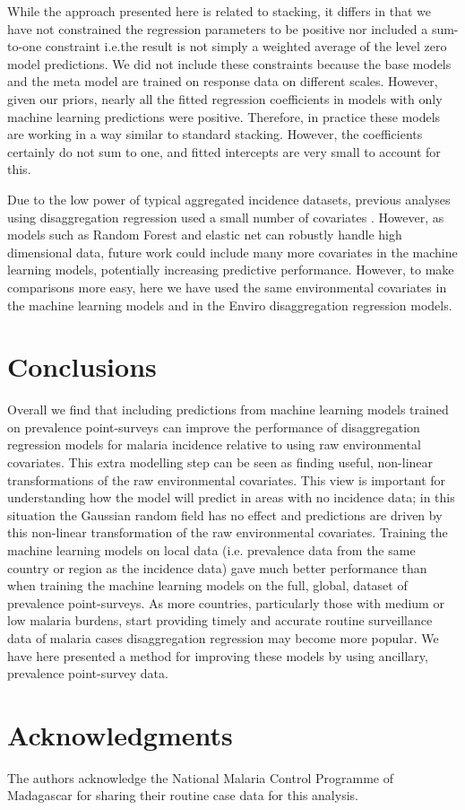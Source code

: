 \documentclass[review]{elsarticle}
\begin{document}
While the approach presented here is related to stacking, it differs in that we have not constrained the regression parameters to be positive nor included a sum-to-one constraint i.e.\thinspace the result is not simply a weighted average of the level zero model predictions.
We did not include these constraints because the base models and the meta model are trained on response data on different scales.
However, given our priors, nearly all the fitted regression coefficients in models with only machine learning predictions were positive.
Therefore, in practice these models are working in a way similar to standard stacking.
However, the coefficients certainly do not sum to one, and fitted intercepts are very small to account for this.


Due to the low power of typical aggregated incidence datasets, previous analyses using disaggregation regression used a small number of covariates \citep{sturrock2014fine}.
However, as models such as Random Forest and elastic net can robustly handle high dimensional data, future work could include many more covariates in the machine learning models, potentially increasing predictive performance.
However, to make comparisons more easy, here we have used the same environmental covariates in the machine learning models and in the Enviro disaggregation regression models.



\section{Conclusions}

Overall we find that including predictions from machine learning models trained on prevalence point-surveys can improve the performance of disaggregation regression models for malaria incidence relative to using raw environmental covariates.
This extra modelling step can be seen as finding useful, non-linear transformations of the raw environmental covariates.
This view is important for understanding how the model will predict in areas with no incidence data; in this situation the Gaussian random field has no effect and predictions are driven by this non-linear transformation of the raw environmental covariates.
Training the machine learning models on local data (i.e. prevalence data from the same country or region as the incidence data) gave much better performance than when training the machine learning models on the full, global, dataset of prevalence point-surveys.
As more countries, particularly those with medium or low malaria burdens, start providing timely and accurate routine surveillance data of malaria cases disaggregation regression may become more popular.
We have here presented a method for improving these models by using ancillary, prevalence point-survey data.



\section*{Acknowledgments}
The authors acknowledge the National Malaria Control Programme of Madagascar for sharing their routine case data for this analysis.

 
%
%
\end{document}
